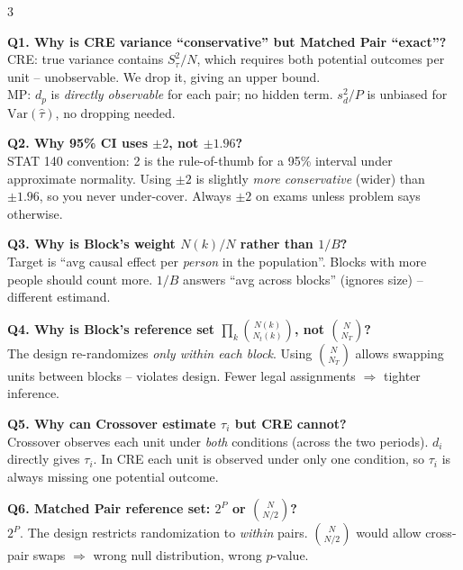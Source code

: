 \documentclass[10pt,landscape]{article}
\begin{document}
\begin{multicols*}{3}
\begin{qbox}
\textbf{Q1. Why is CRE variance ``conservative'' but Matched Pair ``exact''?}\\
CRE: true variance contains $S_\tau^2/N$, which requires both potential outcomes per unit -- unobservable. We drop it, giving an upper bound.\\
MP: $d_p$ is \emph{directly observable} for each pair; no hidden term. $s_d^2/P$ is unbiased for $\mathrm{Var}(\hat\tau)$, no dropping needed.
\end{qbox}

\begin{qbox}
\textbf{Q2. Why 95\% CI uses $\pm 2$, not $\pm 1.96$?}\\
STAT 140 convention: 2 is the rule-of-thumb for a 95\% interval under approximate normality. Using $\pm 2$ is slightly \emph{more conservative} (wider) than $\pm 1.96$, so you never under-cover. Always $\pm 2$ on exams unless problem says otherwise.
\end{qbox}

\begin{qbox}
\textbf{Q3. Why is Block's weight $N(k)/N$ rather than $1/B$?}\\
Target is ``avg causal effect per \emph{person} in the population''. Blocks with more people should count more. $1/B$ answers ``avg across blocks'' (ignores size) -- different estimand.
\end{qbox}

\begin{qbox}
\textbf{Q4. Why is Block's reference set $\prod_k\binom{N(k)}{N_t(k)}$, not $\binom{N}{N_T}$?}\\
The design re-randomizes \emph{only within each block}. Using $\binom{N}{N_T}$ allows swapping units between blocks -- violates design. Fewer legal assignments $\Rightarrow$ tighter inference.
\end{qbox}

\begin{qbox}
\textbf{Q5. Why can Crossover estimate $\tau_i$ but CRE cannot?}\\
Crossover observes each unit under \emph{both} conditions (across the two periods). $d_i$ directly gives $\tau_i$. In CRE each unit is observed under only one condition, so $\tau_i$ is always missing one potential outcome.
\end{qbox}

\begin{qbox}
\textbf{Q6. Matched Pair reference set: $2^P$ or $\binom{N}{N/2}$?}\\
$2^P$. The design restricts randomization to \emph{within} pairs. $\binom{N}{N/2}$ would allow cross-pair swaps $\Rightarrow$ wrong null distribution, wrong $p$-value.
\end{qbox}


\end{multicols*}
\end{document}

